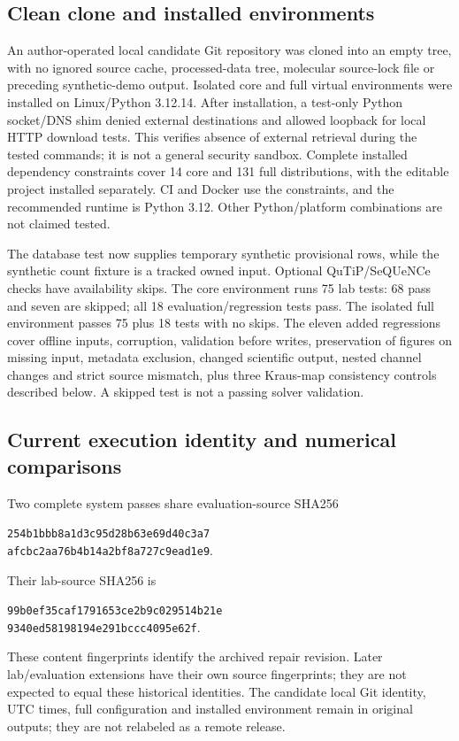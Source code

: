 \subsection{Clean clone and installed environments}
An author-operated local candidate Git repository was cloned into an empty tree, with no ignored source cache, processed-data tree, molecular source-lock file or preceding synthetic-demo output. Isolated core and full virtual environments were installed on Linux/Python 3.12.14. After installation, a test-only Python socket/DNS shim denied external destinations and allowed loopback for local HTTP download tests. This verifies absence of external retrieval during the tested commands; it is not a general security sandbox. Complete installed dependency constraints cover 14 core and 131 full distributions, with the editable project installed separately. CI and Docker use the constraints, and the recommended runtime is Python 3.12. Other Python/platform combinations are not claimed tested.

The database test now supplies temporary synthetic provisional rows, while the synthetic count fixture is a tracked owned input. Optional QuTiP/SeQUeNCe checks have availability skips. The core environment runs 75 lab tests: 68 pass and seven are skipped; all 18 evaluation/regression tests pass. The isolated full environment passes 75 plus 18 tests with no skips. The eleven added regressions cover offline inputs, corruption, validation before writes, preservation of figures on missing input, metadata exclusion, changed scientific output, nested channel changes and strict source mismatch, plus three Kraus-map consistency controls described below. A skipped test is not a passing solver validation.

\subsection{Current execution identity and numerical comparisons}
Two complete system passes share evaluation-source SHA256
\par\noindent\begin{minipage}{\linewidth}\centering\small\texttt{254b1bbb8a1d3c95d28b63e69d40c3a7}\\\texttt{afcbc2aa76b4b14a2bf8a727c9ead1e9}.\end{minipage}\par
Their lab-source SHA256 is
\par\noindent\begin{minipage}{\linewidth}\centering\small\texttt{99b0ef35caf1791653ce2b9c029514b21e}\\\texttt{9340ed58198194e291bccc4095e62f}.\end{minipage}\par
These content fingerprints identify the archived repair revision. Later lab/evaluation extensions have their own source fingerprints; they are not expected to equal these historical identities. The candidate local Git identity, UTC times, full configuration and installed environment remain in original outputs; they are not relabeled as a remote release.

